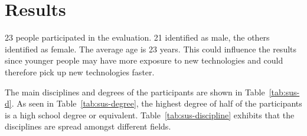 \section{Results}\label{section:eval-results}


\newcommand{\participantsCount}{23}
\newcommand{\participantsMale}{21}
\newcommand{\participantsAge}{23}

\newcommand{\evalExpMvAvgPoses}{2.83}
\newcommand{\evalExpMvStdPoses}{1.94}
\newcommand{\evalExpMvParticipants}{\participantsCount}

\newcommand{\kammAvgHits}{36.23/60}
\newcommand{\kammAvgStd}{6.87/60}
\newcommand{\youngAvgHits}{0.85}
\newcommand{\youngAvgStd}{-}
\newcommand{\oursAvgHits}{26.13/30}
\newcommand{\oursAvgStd}{5.52/30}

\newcommand{\evalExpMvSusScore}{83.04}
\newcommand{\evalExpMvSusGrade}{B}
\newcommand{\evalExpMvSusAdj}{\enquote{Good}}

\newcommand{\evalExpLpSusScore}{91.41}
\newcommand{\evalExpLpSusGrade}{A}
\newcommand{\evalExpLpSusAdj}{\enquote{Excellent}}

\newcommand{\evalExpVkSusScore}{71.63}
\newcommand{\evalExpVkSusGrade}{C}
\newcommand{\evalExpVkSusAdj}{\enquote{Ok}}

\newcommand{\participantsFemale}{\pgfmathparse{\participantsCount - \participantsMale}\pgfmathprintnumber[fixed, precision=2]{\pgfmathresult}}%


\participantsCount{} people participated in the evaluation. \participantsMale{} identified as male, the others identified as female. The average age is \participantsAge{} years. This could influence the results since younger people may have more exposure to new technologies and could therefore pick up new technologies faster.

The main disciplines and degrees of the participants are shown in Table~\ref{tab:sus-d}. As seen in Table~\ref{tab:sus-degree}, the highest degree of half of the participants is a high school degree or equivalent.
Table~\ref{tab:sus-discipline} exhibits that the disciplines are spread amongst different fields.

